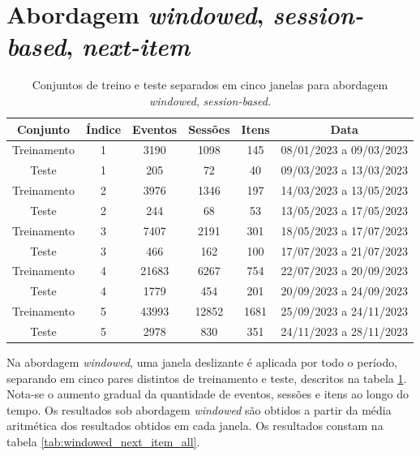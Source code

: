 \section{Abordagem \textit{windowed}, \textit{session-based}, \textit{next-item}}
\begin{table}[htbp]
  \centering
  \begin{tabular}{|c|c|c|c|c|c|}
    \hline
    Conjunto & Índice & Eventos & Sessões & Itens & Data\\
    \hline
    Treinamento & 1 & 3190 & 1098 & 145 & 08/01/2023 a 09/03/2023\\
    \hline
    Teste & 1 & 205 & 72 & 40 & 09/03/2023 a 13/03/2023\\
    \hline
    Treinamento & 2 & 3976 & 1346 & 197 & 14/03/2023 a 13/05/2023\\
    \hline
    Teste & 2 & 244 & 68 & 53 & 13/05/2023 a 17/05/2023\\
    \hline
    Treinamento & 3 & 7407 & 2191 & 301 & 18/05/2023 a 17/07/2023\\
    \hline
    Teste & 3 & 466 & 162 & 100 & 17/07/2023 a 21/07/2023\\
    \hline
    Treinamento & 4 & 21683 & 6267 & 754 & 22/07/2023 a 20/09/2023\\
    \hline
    Teste & 4 & 1779 & 454 & 201 & 20/09/2023 a 24/09/2023\\
    \hline
    Treinamento & 5 & 43993 & 12852 & 1681 & 25/09/2023 a 24/11/2023\\
    \hline
    Teste & 5 & 2978 & 830 & 351 & 24/11/2023 a 28/11/2023\\
    \hline
  \end{tabular}
  \caption{Conjuntos de treino e teste separados em cinco janelas para abordagem \textit{windowed}, \textit{session-based}.}
  \label{tab:windowed_data}
\end{table}

Na abordagem
\textit{windowed}, uma janela deslizante é aplicada por todo o período,
separando em cinco pares distintos de treinamento e teste, descritos na tabela
\ref{tab:windowed_data}. Nota-se o aumento gradual da quantidade de eventos,
sessões e itens ao longo do tempo. Os resultados sob abordagem \textit{windowed} são obtidos a partir da média
aritmética dos resultados obtidos em cada janela. Os resultados constam na
tabela \ref{tab:windowed_next_item_all}.


